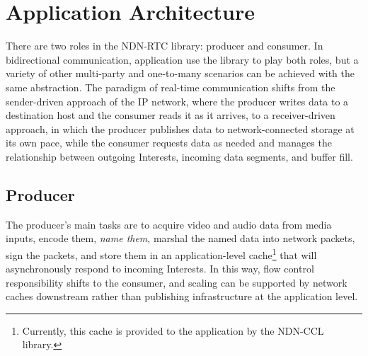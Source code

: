\documentclass{icn/sig-alternate-2013} %
\newcommand{\ndnrtcName}{NDN-RTC} %
\begin{document}

\section{Application Architecture}
\label{sec:arch}

There are two roles in the \ndnrtcName{} library: producer and consumer.  In bidirectional communication, application use the library to play both roles, but a variety of other multi-party and one-to-many scenarios can be achieved with the same abstraction.  The paradigm of real-time communication shifts from the sender-driven approach of the IP network, where the producer writes data to a destination host and the consumer reads it as it arrives, to a receiver-driven approach, in which the producer publishes data to network-connected storage at its own pace, while the consumer requests data as needed and manages the relationship between outgoing Interests, incoming data segments, and buffer fill. 
%


\subsection{Producer}
The producer's main tasks are to acquire video and audio data from media inputs, encode them, \textit{name them}, marshal the named data into network packets, sign the packets, and store them in an application-level cache\footnote{Currently, this cache is provided to the application by the NDN-CCL library.} that will asynchronously respond to incoming Interests. In this way, flow control responsibility shifts to the consumer, and scaling can be supported by network caches downstream rather than publishing infrastructure at the application level.  
\end{document}
